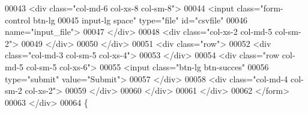 \begin{DoxyCode}
00043                         <div class="col-md-6 col-xs-8 col-sm-8">
00044                             <input class="form-control btn-lg 
00045                                 input-lg space" type="file" id="csvfile"
00046                                 name="input\_file">
00047                         </div>
00048                         <div class="col-xs-2 col-md-5 col-sm-2">
00049                         </div>
00050                     </div>
00051                     <div class="row">
00052                         <div class="col-md-3 col-sm-5 col-xs-4">
00053                         </div>
00054                         <div class="row col-md-5 col-sm-5 col-xs-6">
00055                             <input class="btn-lg btn-succes" 
00056                             type="submit" value="Submit">
00057                         </div>
00058                         <div class="col-md-4 col-sm-2 col-xs-2">
00059                         </div>
00060                     </div>
00061                 </div>
00062         </form>
00063     </div>
00064 \{%
\end{DoxyCode}
